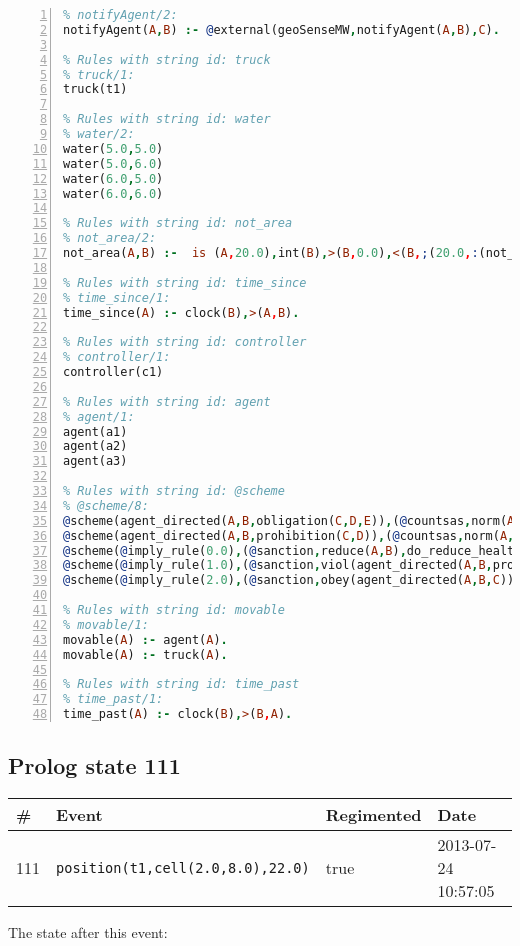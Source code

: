 \documentclass[11pt]{article}\usepackage[utf8]{inputenc}\usepackage{geometry}
\begin{document}
\begin{lstlisting}[language=Prolog, numbers=left]
% Rules with string id: notifyAgent
% notifyAgent/2:
notifyAgent(A,B) :- @external(geoSenseMW,notifyAgent(A,B),C).

% Rules with string id: truck
% truck/1:
truck(t1)

% Rules with string id: water
% water/2:
water(5.0,5.0)
water(5.0,6.0)
water(6.0,5.0)
water(6.0,6.0)

% Rules with string id: not_area
% not_area/2:
not_area(A,B) :-  is (A,20.0),int(B),>(B,0.0),<(B,;(20.0,:(not_area(A,B), is (-(B),20.0)))),int(A),>(A,0.0),<(A,;(20.0,:(area(A,B),-(int(A))))),int(B),>(A,0.0),>(B,0.0),<(A,21.0),<(B,21.0).

% Rules with string id: time_since
% time_since/1:
time_since(A) :- clock(B),>(A,B).

% Rules with string id: controller
% controller/1:
controller(c1)

% Rules with string id: agent
% agent/1:
agent(a1)
agent(a2)
agent(a3)

% Rules with string id: @scheme
% @scheme/8:
@scheme(agent_directed(A,B,obligation(C,D,E)),(@countsas,norm(A,B,F,obligation(C,D,E)),F),false,(listTrue(C)),(time_past(D)),false,[plus(viol(agent_directed(A,B,obligation(C,D,E))))|[]],[plus(obey(agent_directed(A,B,obligation(C,D,E))))|[]])
@scheme(agent_directed(A,B,prohibition(C,D)),(@countsas,norm(A,B,E,prohibition(C,D)),E),(listTrue(C)),false,(false),false,[plus(viol(agent_directed(A,B,prohibition(C,D))))|[]],[plus(obey(agent_directed(A,B,prohibition(C,D))))|[]])
@scheme(@imply_rule(0.0),(@sanction,reduce(A,B),do_reduce_health(A,B),notifyAgent(A,changed(status))),true,false,false,false,[min(reduce(A,B))|[]],[])
@scheme(@imply_rule(1.0),(@sanction,viol(agent_directed(A,B,prohibition(C,D))),do_sanction(D)),true,false,false,false,[min(viol(agent_directed(A,B,prohibition(C,D))))|[]],[])
@scheme(@imply_rule(2.0),(@sanction,obey(agent_directed(A,B,C))),true,false,false,false,[min(obey(agent_directed(A,B,C)))|[]],[])

% Rules with string id: movable
% movable/1:
movable(A) :- agent(A).
movable(A) :- truck(A).

% Rules with string id: time_past
% time_past/1:
time_past(A) :- clock(B),>(B,A).

\end{lstlisting}
\clearpage 
\subsection{Prolog state 111}
\begin{table}[ht]
\centering 
\begin{tabular}{l l l l} 
\textbf{\#} & \textbf{Event} & \textbf{Regimented} & \textbf{Date} \\ [0.5ex] 
\hline
111&\texttt{position(t1,cell(2.0,8.0),22.0)}&true&2013-07-24 10:57:05\\ [1ex] \hline\end{tabular}
\end{table}
The state after this event:
\end{document}

